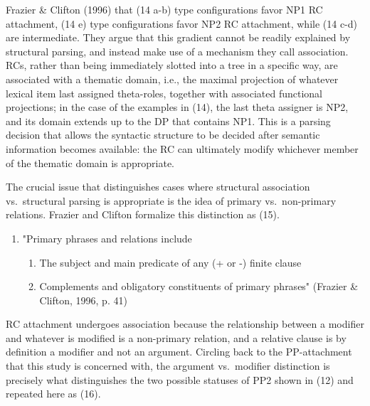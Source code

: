 \documentclass[12pt,oneside]{book}
\providecommand{\tightlist}{%
  \setlength{\itemsep}{0pt}\setlength{\parskip}{0pt}}
\begin{document}
Frazier \& Clifton (1996)  that (14 a-b) type configurations favor NP1 RC attachment, (14 e) type configurations favor NP2 RC attachment, while (14 c-d) are intermediate. They argue that this gradient cannot be readily explained by structural parsing, and instead make use of a mechanism they call  association. RCs, rather than being immediately slotted into a tree in a specific way, are associated with a thematic domain, i.e., the maximal projection of whatever lexical item last assigned theta-roles, together with associated functional projections; in the case of the examples in (14), the last theta assigner is NP2, and its domain extends up to the DP that contains NP1. This is a  parsing decision that allows the syntactic structure to be decided  after semantic information becomes available: the RC can ultimately modify whichever member of the thematic domain is appropriate.

The crucial issue that distinguishes cases where structural association vs.~structural parsing is appropriate is the idea of primary vs.~non-primary relations. Frazier and Clifton formalize this distinction as (15).


\begin{enumerate}
\def\labelenumi{(\arabic{enumi})}
\setcounter{enumi}{14}
\tightlist
\item
  "Primary phrases and relations include

  \begin{enumerate}
  \def\labelenumii{\alph{enumii})}
  \tightlist
  \item
    The subject and main predicate of any (+ or -) finite clause
  \item
    Complements and obligatory constituents of primary phrases"
    (Frazier \& Clifton, 1996, p. 41)
  \end{enumerate}
\end{enumerate}

RC attachment undergoes association because the relationship between a modifier and whatever is modified is a non-primary relation, and a relative clause is by definition a modifier and not an argument. Circling back to the PP-attachment that this study is concerned with, the argument vs.~modifier distinction is precisely what distinguishes the two possible statuses of PP2 shown  in (12) and repeated here as (16).
\end{document}
